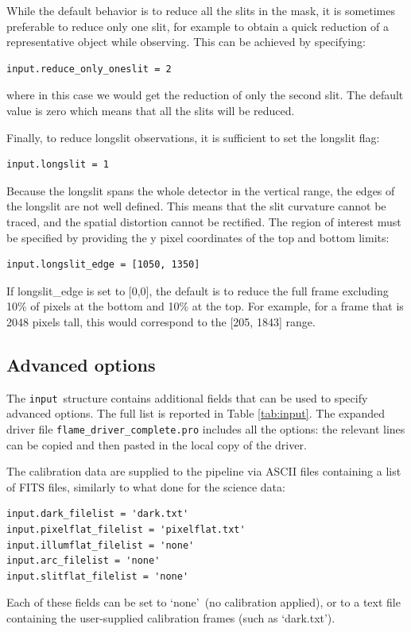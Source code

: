 \documentclass[a4paper, notitlepage]{article}
\newcommand{\inp}{\texttt{input}}
\begin{document}
While the default behavior is to reduce all the slits in the mask, it is sometimes preferable to reduce only one slit, for example to obtain a quick reduction of a representative object while observing. This can be achieved by specifying:
\begin{lstlisting}
input.reduce_only_oneslit = 2
\end{lstlisting}
where in this case we would get the reduction of only the second slit. The default value is zero which means that all the slits will be reduced.

Finally, to reduce longslit observations, it is sufficient to set the longslit flag:
\begin{lstlisting}
input.longslit = 1
\end{lstlisting}
Because the longslit spans the whole detector in the vertical range, the edges of the longslit are not well defined. This means that the slit curvature cannot be traced, and the spatial distortion cannot be rectified. The region of interest must be specified by providing the y pixel coordinates of the top and bottom limits:
\begin{lstlisting}
input.longslit_edge = [1050, 1350]
\end{lstlisting}
If longslit\_edge is set to [0,0], the default is to reduce the full frame excluding 10\% of pixels at the bottom and 10\% at the top. For example, for a frame that is 2048 pixels tall, this would correspond to the [205, 1843] range.


\subsection{Advanced options}

The \inp\ structure contains additional fields that can be used to specify advanced options. The full list is reported in Table \ref{tab:input}. The expanded driver file \texttt{flame\_driver\_complete.pro} includes all the options: the relevant lines can be copied and then pasted in the local copy of the driver.

The calibration data are supplied to the pipeline via ASCII files containing a list of FITS files, similarly to what done for the science data:
\begin{lstlisting}
input.dark_filelist = 'dark.txt'
input.pixelflat_filelist = 'pixelflat.txt'
input.illumflat_filelist = 'none'
input.arc_filelist = 'none'
input.slitflat_filelist = 'none'
\end{lstlisting}
Each of these fields can be set to \textquoteleft none\textquoteright\ (no calibration applied), or to a text file containing the user-supplied calibration frames (such as \textquoteleft dark.txt\textquoteright).
\end{document}
